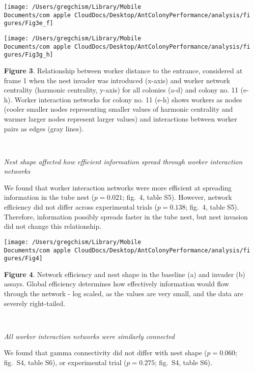 \documentclass[3p]{elsarticle} %
\begin{document}
\begin{flushleft}\texttt{[image: /Users/gregchism/Library/Mobile Documents/com~apple~CloudDocs/Desktop/AntColonyPerformance/analysis/figures/Fig3e\_f]} \end{flushleft}

\begin{flushleft}\texttt{[image: /Users/gregchism/Library/Mobile Documents/com~apple~CloudDocs/Desktop/AntColonyPerformance/analysis/figures/Fig3g\_h]} \end{flushleft}

\textbf{Figure 3}. Relationship between worker distance to the entrance,
considered at frame 1 when the nest invader was introduced (x-axis) and
worker network centrality (harmonic centrality, y-axis) for all colonies
(a-d) and colony no. 11 (e-h). Worker interaction networks for colony
no. 11 (e-h) shows workers as nodes (cooler smaller nodes representing
smaller values of harmonic centrality and warmer larger nodes represent
larger values) and interactions between worker pairs as edges (gray
lines).

~

\emph{Nest shape affected how efficient information spread through
worker interaction networks}

We found that worker interaction networks were more efficient at
spreading information in the tube nest (\(p = 0.021\); fig.~4, table
S5). However, network efficiency did not differ across experimental
trials (\(p = 0.138\); fig.~4, table S5). Therefore, information
possibly spreads faster in the tube nest, but nest invasion did not
change this relationship.

\begin{flushleft}\texttt{[image: /Users/gregchism/Library/Mobile Documents/com~apple~CloudDocs/Desktop/AntColonyPerformance/analysis/figures/Fig4]} \end{flushleft}

\textbf{Figure 4}. Network efficiency and nest shape in the baseline (a)
and invader (b) assays. Global efficiency determines how effectively
information would flow through the network - log scaled, as the values
are very small, and the data are severely right-tailed.

~

\emph{All worker interaction networks were similarly connected}

We found that gamma connectivity did not differ with nest shape
(\(p = 0.060\); fig.~S4, table S6), or experimental trial
(\(p = 0.275\); fig.~S4, table S6).
\end{document}
